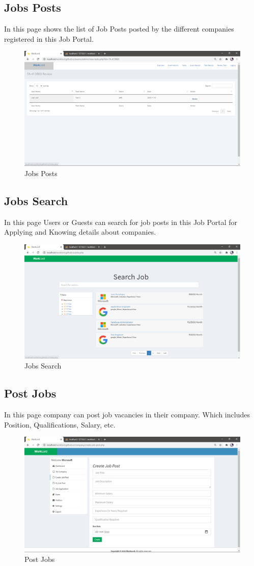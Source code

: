 \documentclass[a4paper,12pt]{report}
\begin{document}
\pagebreak

\subsection {Jobs Posts}
In this page shows the list of Job Posts posted by the different companies registered in this Job Portal.
\begin{figure}[bph]
	\centering
	\includegraphics[width=.7\linewidth ]{img/screenshots/admin/task_review2}
	\caption{Jobs Posts}
\end{figure}

\subsection {Jobs Search}
In this page Users or Guests can search for job posts in this Job Portal for Applying and Knowing details about companies.
\begin{figure}[bph]
	\centering
	\includegraphics[width=.7\linewidth ]{img/screenshots/jobsearch}
	\caption{Jobs Search}
\end{figure}

\pagebreak

\subsection {Post Jobs}
In this page company can post job vacancies in their company. Which includes Position, Qualifications, Salary, etc.
\begin{figure}[bph]
	\centering
	\includegraphics[width=.7\linewidth ]{img/screenshots/company/company_cre_post}
	\caption{Post Jobs}
\end{figure}
\end{document}
